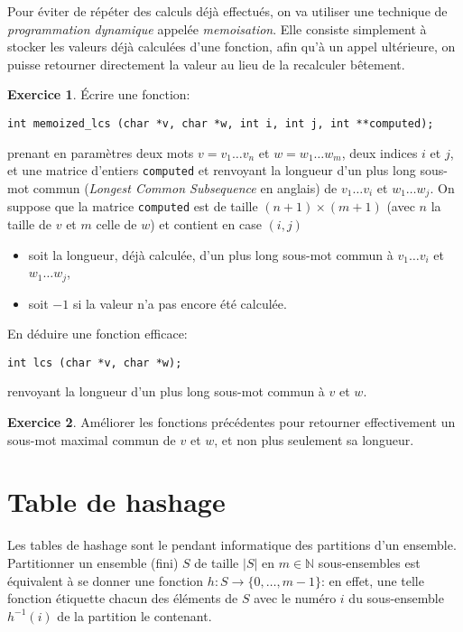 \documentclass[french,a4paper]{article}
\theoremstyle{definition}
\newtheorem{exercise}{Exercice}
\theoremstyle{remark}
\newcommand{\inlinec}[1]{\lstinline[style=C]°#1°}
\begin{document}
\medskip

Pour éviter de répéter des calculs déjà effectués, on va utiliser une
technique de {\em programmation dynamique} appelée {\em
  memoisation}. Elle consiste simplement à stocker les valeurs déjà
calculées d'une fonction, afin qu'à un appel ultérieure, on puisse
retourner directement la valeur au lieu de la recalculer bêtement.
\begin{exercise}
  \'Ecrire une fonction:
\begin{lstlisting}
int memoized_lcs (char *v, char *w, int i, int j, int **computed); 
\end{lstlisting}
  prenant en paramètres deux mots $v=v_1\dots v_{n}$ et
  $w = w_1\dots w_{m}$, deux indices $i$ et $j$, et une matrice
  d'entiers \inlinec{computed} et renvoyant la longueur d'un plus long
  sous-mot commun ({\em Longest Common Subsequence} en anglais) de
  $v_1\dots v_i$ et $w_1\dots w_j$. On suppose que la matrice
  \inlinec{computed} est de taille $(n+1) \times (m+1)$ (avec $n$ la
  taille de $v$ et $m$ celle de $w$) et contient en case $(i,j)$
  \begin{itemize}
  \item soit la longueur, déjà calculée, d'un plus long sous-mot
    commun à $v_1\dots v_i$ et $w_1\dots w_j$,
  \item soit $-1$ si la valeur n'a pas encore été calculée.
  \end{itemize}

  En déduire une fonction efficace:
\begin{lstlisting}
int lcs (char *v, char *w);
\end{lstlisting}
  renvoyant la longueur d'un plus long sous-mot commun à $v$ et $w$.
\end{exercise}

\begin{exercise}
  Améliorer les fonctions précédentes pour retourner effectivement un
  sous-mot maximal commun de $v$ et $w$, et non plus seulement sa
  longueur.
\end{exercise}

\section{Table de hashage}
\label{sec:hash-table}

Les tables de hashage sont le pendant informatique des partitions d'un
ensemble. Partitionner un ensemble (fini) $S$ de taille
$\lvert S \rvert$ en $m\in \mathbb N$ sous-ensembles est équivalent à
se donner une fonction $h : S \to \{0,\dots,m-1\}$: en effet, une
telle fonction étiquette chacun des éléments de $S$ avec le numéro $i$
du sous-ensemble $h^{-1}(i)$ de la partition le contenant.
\end{document}
